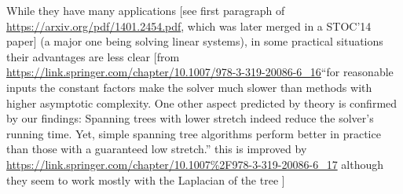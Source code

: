 

While they have many applications [see first paragraph of \url{https://arxiv.org/pdf/1401.2454.pdf},
which was later merged in a STOC'14 paper] (a major one being solving linear systems), in some
practical situations their advantages are less clear [from
\url{https://link.springer.com/chapter/10.1007/978-3-319-20086-6_16}\enquote{for reasonable inputs
the constant factors make the solver much slower than methods with higher asymptotic complexity.
One other aspect predicted by theory is confirmed by our findings: Spanning trees with lower
stretch indeed reduce the solver's running time. Yet, simple spanning tree algorithms perform
better in practice than those with a guaranteed low stretch.} this is improved by
\url{https://link.springer.com/chapter/10.1007%2F978-3-319-20086-6_17} although they seem to work
	mostly with the Laplacian of the tree ]
